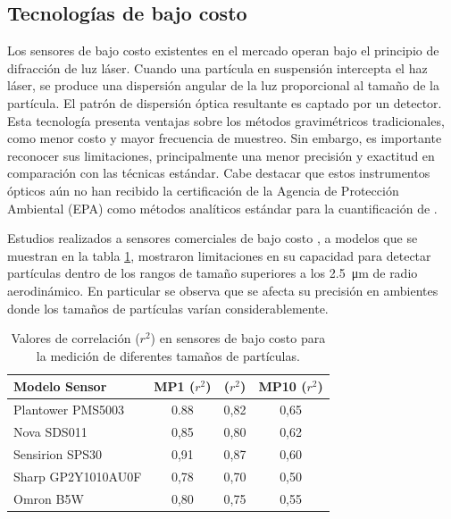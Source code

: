 \subsection{Tecnologías de bajo costo}




Los sensores de bajo costo existentes en el mercado operan bajo el principio de difracción de luz láser. Cuando una partícula en suspensión intercepta el haz láser, se produce una dispersión angular de la luz proporcional al tamaño de la partícula. El patrón de dispersión óptica resultante es captado por un detector. Esta tecnología presenta ventajas sobre los métodos gravimétricos tradicionales, como menor costo y mayor frecuencia de muestreo. Sin embargo, es importante reconocer sus limitaciones, principalmente una menor precisión y exactitud en comparación con las técnicas estándar. Cabe destacar que estos instrumentos ópticos aún no han recibido la certificación de la Agencia de Protección Ambiental (EPA) como métodos analíticos estándar para la cuantificación de \MPF.

Estudios realizados a sensores comerciales de bajo costo \citep{Kuula2020}, a modelos que se muestran en la tabla \ref{table:correlation_sensors}, mostraron limitaciones en su capacidad para detectar partículas dentro de los rangos de tamaño superiores a los \SI{2,5}{\um} de radio aerodinámico. En particular se observa que se afecta su precisión en ambientes donde los tamaños de partículas varían considerablemente.


\begin{table}[h!]
	\centering
	\small
	\caption{Valores de correlación ($r^{2}$) en sensores de bajo costo para la medición de diferentes tamaños de partículas.}
	\begin{tabular}{lccc}
		\toprule
		\textbf{Modelo Sensor} & \textbf{MP1 ($r^{2}$)} & \textbf{\MPF ($r^{2}$)} & \textbf{MP10 ($r^{2}$)} \\
		\midrule
		Plantower PMS5003     & \num{0,88}              & 0,82                & 0,65               \\
		Nova SDS011           & 0,85              & 0,80                & 0,62               \\
		Sensirion SPS30       & 0,91              & 0,87                & 0,60               \\
		Sharp GP2Y1010AU0F    & 0,78              & 0,70                & 0,50               \\
		Omron B5W             & 0,80              & 0,75                & 0,55               \\
		\bottomrule
	\end{tabular}
	\label{table:correlation_sensors}
\end{table}


